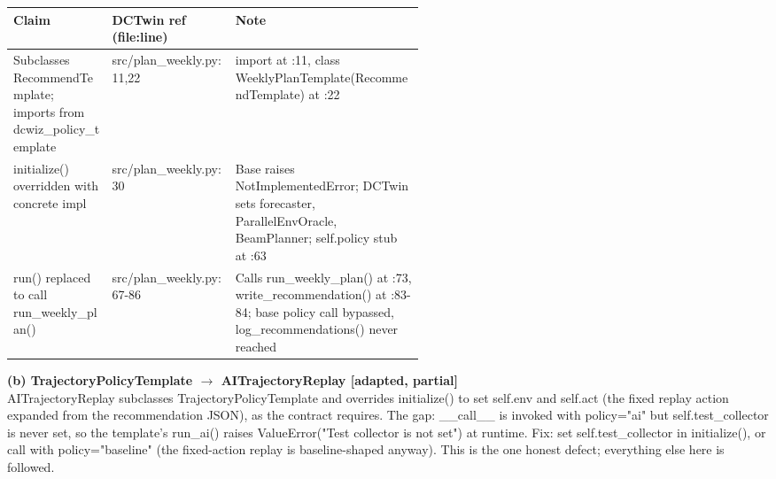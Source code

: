 \documentclass[10pt]{article}
\begin{document}
\vspace{1pt}\begin{tabularx}{\linewidth}{@{}p{0.24\linewidth} p{0.30\linewidth} X@{}}
\toprule
\textbf{Claim} & \textbf{DCTwin ref (file:line)} & \textbf{Note} \\
\midrule
Subclasses RecommendTemplate; imports from dcwiz\_\allowbreak{}policy\_\allowbreak{}template & src/\allowbreak{}plan\_\allowbreak{}weekly.py:11,22 & import at :11, class WeeklyPlanTemplate(RecommendTemplate) at :22 \\
initialize() overridden with concrete impl & src/\allowbreak{}plan\_\allowbreak{}weekly.py:30 & Base raises NotImplementedError; DCTwin sets forecaster, ParallelEnvOracle, BeamPlanner; self.policy stub at :63 \\
run() replaced to call run\_\allowbreak{}weekly\_\allowbreak{}plan() & src/\allowbreak{}plan\_\allowbreak{}weekly.py:67-86 & Calls run\_\allowbreak{}weekly\_\allowbreak{}plan() at :73, write\_\allowbreak{}recommendation() at :83-84; base policy call bypassed, log\_\allowbreak{}recommendations() never reached \\
\bottomrule
\end{tabularx}\vspace{2pt}
\smallskip\noindent\textbf{(b) TrajectoryPolicyTemplate $\rightarrow$ AITrajectoryReplay [adapted, partial]}\\[1pt]
AITrajectoryReplay subclasses TrajectoryPolicyTemplate and overrides initialize() to set self.env and self.act (the fixed replay action expanded from the recommendation JSON), as the contract requires. The gap: \_\allowbreak{}\_\allowbreak{}call\_\allowbreak{}\_\allowbreak{} is invoked with policy="ai" but self.test\_\allowbreak{}collector is never set, so the template's run\_\allowbreak{}ai() raises ValueError("Test collector is not set") at runtime. Fix: set self.test\_\allowbreak{}collector in initialize(), or call with policy="baseline" (the fixed-action replay is baseline-shaped anyway). This is the one honest defect; everything else here is followed.
\end{document}
